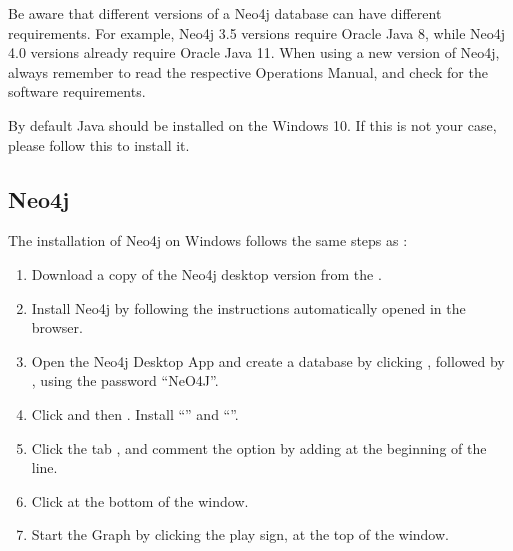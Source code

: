 \documentclass[letterpaper,10pt,english]{sphinxmanual}
\begin{document}
Be aware that different versions of a Neo4j database can have different requirements. For example, Neo4j 3.5 versions require Oracle Java 8, while Neo4j 4.0 versions already require Oracle Java 11.
When using a new version of Neo4j, always remember to read the respective Operations Manual, and check for the software requirements.

By default Java should be installed on the Windows 10. If this is not your case, please follow this  to install it.


\subsection{Neo4j}
\label{\detokenize{intro/getting-started-with-windows:neo4j}}
The installation of Neo4j on Windows follows the same steps as {\hyperref[\detokenize{intro/getting-started-with-neo4j:getting-started-with-neo4j}]{}}:
\begin{enumerate}
%
\item {} 
Download a copy of the Neo4j desktop version from the .

\item {} 
Install Neo4j by following the instructions automatically opened in the browser.

\item {} 
Open the Neo4j Desktop App and create a database by clicking , followed by , using the password “NeO4J”.

\item {} 
Click  and then . Install “” and “”.

\item {} 
Click the tab , and comment the option  by adding \sphinxcode{\sphinxupquote{\#}} at the beginning of the line.

\item {} 
Click  at the bottom of the window.

\item {} 
Start the Graph by clicking the play sign, at the top of the window.

\end{enumerate}
\end{document}
